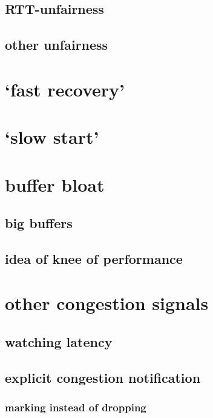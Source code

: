 \subsection{RTT-unfairness}


\subsection{other unfairness}


\section{`fast recovery'}

\section{`slow start'}

\section{buffer bloat}

\subsection{big buffers}

\subsection{idea of knee of performance}

\section{other congestion signals}

\subsection{watching latency}

\subsection{explicit congestion notification}

\subsubsection{marking instead of dropping}

